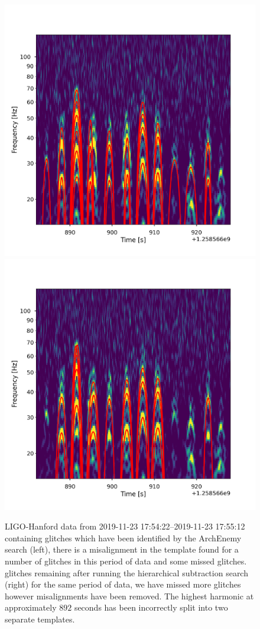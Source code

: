 \begin{figure}
     \centering
     \begin{minipage}[t]{1.0\linewidth}
        \includegraphics[width=0.49\linewidth]{images/4_archenemy/Section3/3.6/overlay_good_overlays_first.pdf}
        \hspace{0.02\linewidth}
        \includegraphics[width=0.49\linewidth]{images/4_archenemy/Section3/3.6/overlay_good_overlays_second.pdf}
     \end{minipage}
         \caption{LIGO-Hanford data from 2019-11-23 17:54:22--2019-11-23 17:55:12 containing \scl{} glitches which have been identified by the ArchEnemy search (left), there is a misalignment in the template found for a number of glitches in this period of data and some missed glitches. \Scl{} glitches remaining after running the hierarchical subtraction search (right) for the same period of data, we have missed more \scl{} glitches however misalignments have been removed. The highest harmonic at approximately $892$ seconds has been incorrectly split into two separate templates.}
    \label{4:fig:overlay_goods}
\end{figure}

